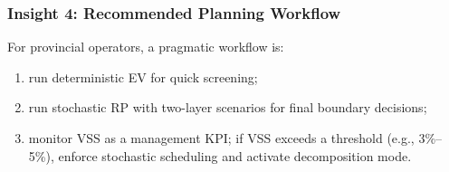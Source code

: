 \documentclass[11pt]{article}
\begin{document}
\subsubsection{Insight 4: Recommended Planning Workflow}

For provincial operators, a pragmatic workflow is:
\begin{enumerate}
  \item run deterministic EV for quick screening;
  \item run stochastic RP with two-layer scenarios for final boundary
    decisions;
  \item monitor VSS as a management KPI; if VSS exceeds a threshold
    (e.g., 3\%--5\%), enforce stochastic scheduling and activate
    decomposition mode.
\end{enumerate}
\end{document}
